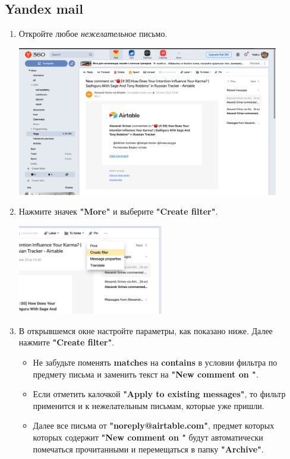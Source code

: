 \documentclass[
a4paper, %
12pt, %
article,
onecolumn, %
openany, %
]{memoir}
\begin{document}
\newpage
\subsection{Yandex mail}
\begin{enumerate}
    \item Откройте любое \emph{нежелательное} письмо.
	    \begin{center} 
	        \includegraphics[width=0.9\textwidth]{AirTableSpam/ya0} 
	    \end{center}
    \item Нажмите значек \textbf{"More"} и выберите 
                \textbf{"Create filter"}.
	    \begin{center} 
	        \includegraphics[width=0.5\textwidth]{AirTableSpam/ya1} 
	    \end{center}
    \item В открывшемся окне настройте параметры, как показано ниже. 
        Далее нажмите \textbf{"Create filter"}.
        \begin{itemize}
            \item Не забудьте поменять \textbf{matches} на 
                \textbf{contains} в условии 
                фильтра по предмету письма и заменить текст на 
                \textbf{"New comment on "}.
            \item Если отметить калочкой \textbf{"Apply to existing messages"},
                то фильтр применится и к нежелательным письмам, которые 
                уже пришли.
            \item Далее все письма от \textbf{"noreply@airtable.com"}, предмет
                которых которых содержит \textbf{"New comment on "} 
                будут автоматически помечаться прочитанными 
                и перемещаться в папку \textbf{"Archive"}.
        \end{itemize}


\end{enumerate}
\end{document}
